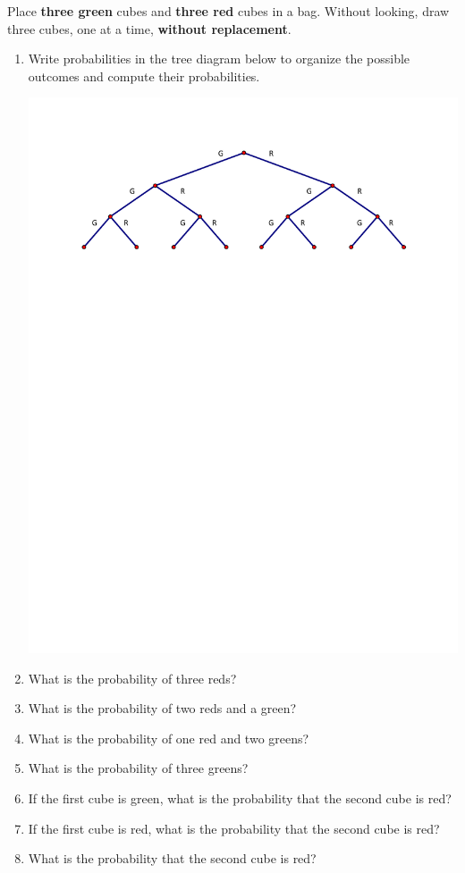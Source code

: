 \documentclass[nooutcomes]{ximera}
\begin{document}
\begin{problem}
Place \textbf{three green} cubes and \textbf{three red} cubes in a bag.  Without looking, draw three cubes, one at a time, \textbf{without replacement}.  
\begin{enumerate}
\item Write probabilities in the tree diagram below to organize the possible outcomes and compute their probabilities.  
\begin{image}
\includegraphics[scale=0.8]{graphics/Tree.pdf}
\end{image}
\vspace{.15in}
\item What is the probability of three reds? 
\item What is the probability of two reds and a green? 
\item What is the probability of one red and two greens? 
\item What is the probability of three greens? 
\item If the first cube is green, what is the probability that the second cube is red? 
\item If the first cube is red, what is the probability that the second cube is red? 
\item What is the probability that the second cube is red?  
\end{enumerate}
\end{problem}
\end{document}
